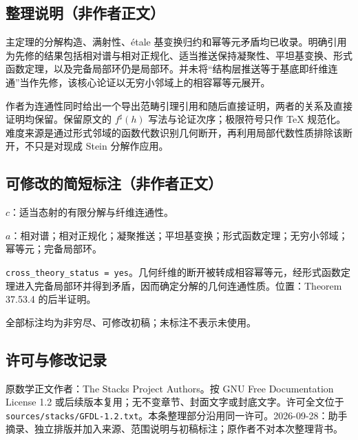 \documentclass[UTF8,11pt]{ctexart}
\theoremstyle{definition}
\begin{document}
\subsection*{整理说明（非作者正文）}
主定理的分解构造、满射性、\'etale 基变换归约和幂等元矛盾均已收录。明确引用为先修的结果包括相对谱与相对正规化、适当推送保持凝聚性、平坦基变换、形式函数定理，以及完备局部环仍是局部环。并未将“结构层推送等于基底即纤维连通”当作先修，该核心论证以无穷小邻域上的相容幂等元展开。

作者为连通性同时给出一个导出范畴引理引用和随后直接证明，两者的关系及直接证明均保留。保留原文的 $f^\sharp(h)$ 写法与论证次序；极限符号只作 TeX 规范化。难度来源是通过形式邻域的函数代数识别几何断开，再利用局部代数性质排除该断开，不只是对现成 Stein 分解作应用。
\subsection*{可修改的简短标注（非作者正文）}
$c$：适当态射的有限分解与纤维连通性。

$a$：相对谱；相对正规化；凝聚推送；平坦基变换；形式函数定理；无穷小邻域；幂等元；完备局部环。

\texttt{cross\_theory\_status = yes}。几何纤维的断开被转成相容幂等元，经形式函数定理进入完备局部环并得到矛盾，因而确定分解的几何连通性质。位置：Theorem 37.53.4 的后半证明。

全部标注均为非穷尽、可修改初稿；未标注不表示未使用。
\subsection*{许可与修改记录}
原数学正文作者：The Stacks Project Authors。按 GNU Free Documentation License 1.2 或后续版本复用；无不变章节、封面文字或封底文字。许可全文位于 \texttt{sources/stacks/GFDL-1.2.txt}。本条整理部分沿用同一许可。2026-09-28：助手摘录、独立排版并加入来源、范围说明与初稿标注；原作者不对本次整理背书。
\end{document}
